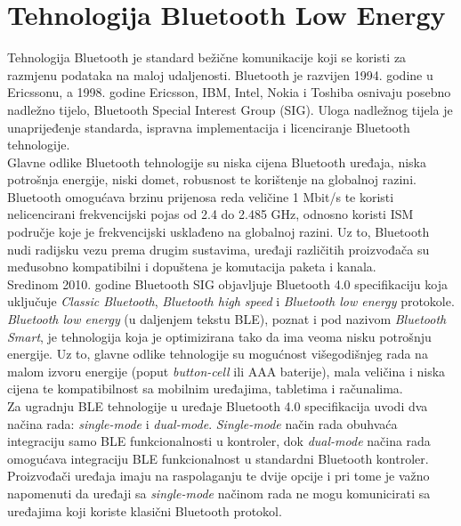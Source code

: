 \chapter{Tehnologija Bluetooth Low Energy}
\label{chap:ble}
    
Tehnologija Bluetooth je standard bežične komunikacije koji se koristi za razmjenu podataka na maloj udaljenosti. 
Bluetooth je razvijen 1994. godine u Ericssonu, a 1998. godine Ericsson, IBM, Intel, Nokia i Toshiba osnivaju posebno nadležno tijelo, Bluetooth Special Interest Group (SIG). 
Uloga nadležnog tijela je unaprijeđenje standarda, ispravna implementacija i licenciranje Bluetooth tehnologije.
\\

Glavne odlike Bluetooth tehnologije su niska cijena Bluetooth uređaja, niska potrošnja energije, niski domet, robusnost te korištenje na globalnoj razini. 
Bluetooth omogućava brzinu prijenosa reda veličine 1 Mbit/s te koristi nelicencirani frekvencijski pojas od 2.4 do 2.485 GHz, odnosno koristi ISM područje  koje je frekvencijski usklađeno na globalnoj razini. 
Uz to, Bluetooth nudi radijsku vezu prema drugim sustavima, uređaji različitih proizvođača su međusobno kompatibilni i dopuštena je komutacija paketa i kanala.
\\%

Sredinom 2010. godine Bluetooth SIG objavljuje Bluetooth 4.0 specifikaciju koja uključuje \textit{Classic Bluetooth}, \textit{Bluetooth high speed} i \textit{Bluetooth low energy} protokole. 
\textit{Bluetooth low energy} (u daljenjem tekstu BLE), poznat i pod nazivom \textit{Bluetooth Smart}, je tehnologija koja je optimizirana tako da ima veoma nisku potrošnju energije. 
Uz to, glavne odlike tehnologije su mogućnost višegodišnjeg rada na malom izvoru energije (poput \textit{button-cell} ili AAA baterije), mala veličina i niska cijena te kompatibilnost sa mobilnim uređajima, tabletima i računalima. 
\\
Za ugradnju BLE tehnologije u uređaje Bluetooth 4.0 specifikacija uvodi dva načina rada: \textit{single-mode} i \textit{dual-mode}. 
\textit{Single-mode} način rada obuhvaća integraciju samo BLE funkcionalnosti u kontroler, dok \textit{dual-mode} načina rada omogućava integraciju BLE funkcionalnost u standardni Bluetooth kontroler. 
Proizvođači uređaja imaju na raspolaganju te dvije opcije i pri tome je važno napomenuti da uređaji sa \textit{single-mode} načinom rada ne mogu komunicirati sa uređajima koji koriste klasični Bluetooth protokol.
\\

